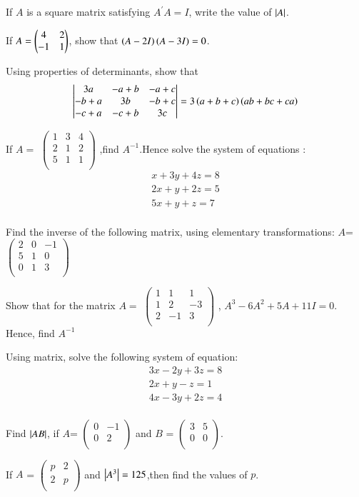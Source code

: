 \item If $A$ is a square matrix satisfying $A^\prime{A}=I$, write the value of $\left\vert A\right\vert$.
\item If $A= \begin{pmatrix} 4 & 2 \\ -1 & 1 \\\end{pmatrix}$, show that $\left(A-2I\right)\left(A-3I\right)=0$.
\item Using properties of determinants, show that
\[\begin{vmatrix}
3a      &     -a+b  &    -a+c\\
-b+a    &      3b   &    -b+c\\
-c+a    &     -c+b  &     3c \\
\end{vmatrix}= 3\left(a+b+c\right)\left(ab+bc+ca\right)\]
\item If $A=$ ${\begin{pmatrix}
    1 & 3 & 4\\
    2 & 1 & 2\\
    5 & 1 & 1\\
\end{pmatrix}}$
,find  ${A}^{-1}$.Hence solve the system of equations :
\begin{align*}
      {x + 3y + 4z = 8} \\
      {2x + y + 2z = 5}\\
    {5x + y + z = 7}\\
\end{align*}
\item Find the inverse of the following matrix, using elementary transformations:
$A$= ${\begin{pmatrix}
    2 & 0 & -1\\
    5 & 1 & 0\\
    0 & 1 & 3\\
\end{pmatrix}}$
\item Show that for the matrix $A=$ $\begin{pmatrix}
  1 & 1 &  1 \\
  1 & 2 & -3 \\
  2 & -1 & 3 \\
\end{pmatrix}$ , ${A}^3 - 6{A}^2 + 5{A} +11 I = 0$.\\
Hence, find ${A}^{-1}$
\item  Using matrix, solve the following system of equation:
\begin{align*}	
	{3x - 2y + 3z = 8}\\                             {2x + y - z = 1}\\                            {4x - 3y + 2z = 4}\\
\end{align*}
\item  Find  $\left\vert AB\right\vert$, if $A$= $\begin{pmatrix}0 & -1 \\
0 & 2 \\\end{pmatrix}$
and $B$ = $\begin{pmatrix}
3 & 5\\0 & 0\\
\end{pmatrix}$.
\item If $A$ = $\begin{pmatrix}    p & 2\\
    2 & p\\\end{pmatrix}$
and $\left\vert A^3\right\vert=125$,then find the values of $p$.

